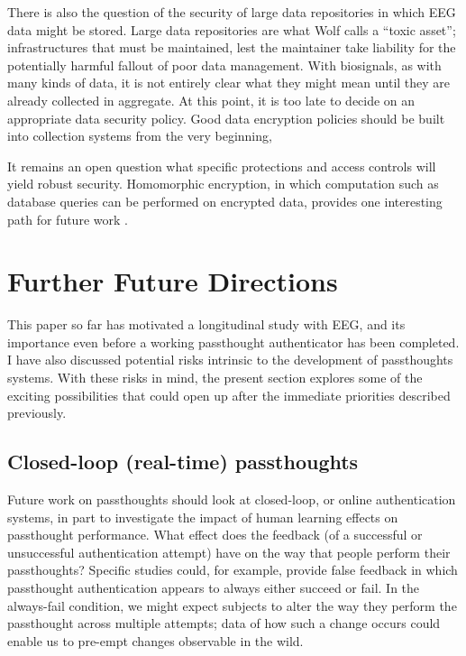 \documentclass[sigconf]{acmart}
\begin{document}
There is also the question of the security of large data repositories in which EEG data might be stored.
Large data repositories are what Wolf \cite{Wolf2010} calls a ``toxic asset''; infrastructures that must be maintained, lest the maintainer take liability for the potentially harmful fallout of poor data management.
With biosignals, as with many kinds of data, it is not entirely clear what they might mean until they are already collected in aggregate. 
At this point, it is too late to decide on an appropriate data security policy.
Good data encryption policies should be built into collection systems from the very beginning, 

It remains an open question what specific protections and access controls will yield robust security.
Homomorphic encryption, in which computation such as database queries can be performed on encrypted data, provides one interesting path for future work \cite{Tu2013}.

\section{Further Future Directions}
\label{sec:org1a27b88}

This paper so far has motivated a longitudinal study with EEG, and its importance even before a working passthought authenticator has been completed. 
I have also discussed potential risks intrinsic to the development of passthoughts systems.
With these risks in mind, the present section explores some of the exciting possibilities that could open up after the immediate priorities described previously.

\subsection{Closed-loop (real-time) passthoughts}
\label{sec:org1fcdc9f}
Future work on passthoughts should look at closed-loop, or online authentication systems,
in part to investigate the impact of human learning effects on passthought performance.
What effect does the feedback (of a successful or unsuccessful authentication attempt) have on the way that people perform their passthoughts?
Specific studies could, for example, provide false feedback in which passthought authentication appears to always either succeed or fail. In the always-fail condition, we might expect subjects to alter the way they perform the passthought across multiple attempts; data of how such a change occurs could enable us to pre-empt changes observable in the wild.
\end{document}
